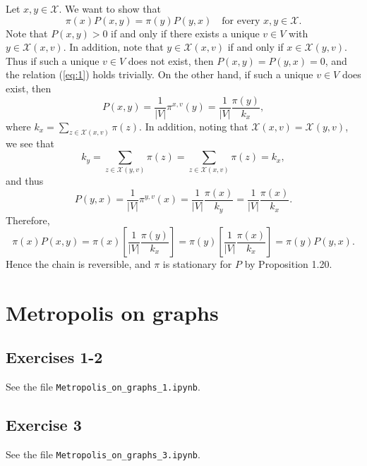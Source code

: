\documentclass[12pt]{article}
\begin{document}
Let $x, y \in \mathcal{X}$. We want to show that
\begin{equation} \label{eq:1}
\pi(x) P(x, y) = \pi(y) P(y, x) \quad \text{for every $x, y \in \mathcal{X}$}.
\end{equation}
Note that $P(x, y) > 0$ if and only if there exists a unique $v \in V$ with $y \in \mathcal{X}(x, v)$. In addition, note that $y \in \mathcal{X}(x, v)$ if and only if $x \in \mathcal{X}(y, v)$. Thus if such a unique $v \in V$ does not exist, then $P(x, y) = P(y, x) = 0$, and the relation (\ref{eq:1}) holds trivially. On the other hand, if such a unique $v \in V$ does exist, then
\begin{equation*}
P(x, y) = \frac{1}{|V|} \pi^{x, v}(y) = \frac{1}{|V|} \frac{\pi(y)}{k_x},
\end{equation*}
where $k_x = \sum_{z \in \mathcal{X}(x, v)} \pi(z)$. In addition, noting that $\mathcal{X}(x, v) = \mathcal{X}(y, v)$, we see that
\begin{equation*}
k_y = \sum_{z \in \mathcal{X}(y, v)} \pi(z) = \sum_{z \in \mathcal{X}(x, v)} \pi(z) = k_x,
\end{equation*}
and thus
\begin{equation*}
P(y, x) = \frac{1}{|V|} \pi^{y, v}(x) = \frac{1}{|V|} \frac{\pi(x)}{k_y} = \frac{1}{|V|} \frac{\pi(x)}{k_x}.
\end{equation*}
Therefore,
\begin{equation*}
\pi(x) P(x, y) = \pi(x) \left[\frac{1}{|V|} \frac{\pi(y)}{k_x} \right] = \pi(y) \left[\frac{1}{|V|} \frac{\pi(x)}{k_x} \right] = \pi(y) P(y, x).
\end{equation*}
Hence the chain is reversible, and $\pi$ is stationary for $P$ by Proposition 1.20.

\section*{Metropolis on graphs}

\subsection*{Exercises 1-2}

See the file \texttt{Metropolis\_on\_graphs\_1.ipynb}.

\subsection*{Exercise 3}

See the file \texttt{Metropolis\_on\_graphs\_3.ipynb}.
\end{document}
